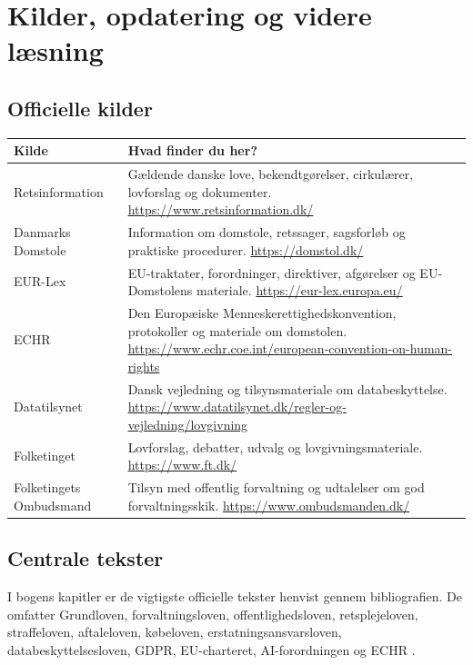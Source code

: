 \chapter{Kilder, opdatering og videre læsning}


\section{Officielle kilder}

\small
\begin{longtable}{@{}p{3.1cm}@{}p{9.9cm}@{}}
\toprule
\textbf{Kilde} & \textbf{Hvad finder du her?} \\
\midrule
Retsinformation & Gældende danske love, bekendtgørelser, cirkulærer, lovforslag og dokumenter. \url{https://www.retsinformation.dk/} \\
Danmarks Domstole & Information om domstole, retssager, sagsforløb og praktiske procedurer. \url{https://domstol.dk/} \\
EUR-Lex & EU-traktater, forordninger, direktiver, afgørelser og EU-Domstolens materiale. \url{https://eur-lex.europa.eu/} \\
ECHR & Den Europæiske Menneskerettighedskonvention, protokoller og materiale om domstolen. \url{https://www.echr.coe.int/european-convention-on-human-rights} \\
Datatilsynet & Dansk vejledning og tilsynsmateriale om databeskyttelse. \url{https://www.datatilsynet.dk/regler-og-vejledning/lovgivning} \\
Folketinget & Lovforslag, debatter, udvalg og lovgivningsmateriale. \url{https://www.ft.dk/} \\
Folketingets Ombudsmand & Tilsyn med offentlig forvaltning og udtalelser om god forvaltningsskik. \url{https://www.ombudsmanden.dk/} \\
\bottomrule
\end{longtable}
\normalsize

\section{Centrale tekster}

I bogens kapitler er de vigtigste officielle tekster henvist gennem bibliografien. De omfatter Grundloven, forvaltningsloven, offentlighedsloven, retsplejeloven, straffeloven, aftaleloven, købeloven, erstatningsansvarsloven, databeskyttelsesloven, GDPR, EU-charteret, AI-forordningen og ECHR \citep{grundloven,forvaltningsloven,offentlighedsloven,retsplejeloven,straffeloven,aftaleloven,koebeloven,erstatningsansvar,databeskyttelsesloven,gdpr,ai-act,charter,echr}.

